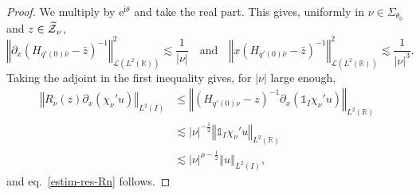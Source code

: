 \documentclass[10pt]{amsart}
\theoremstyle{definition}\newtheorem{defi}[theo]{Definition}\newtheorem{rema}[theo]{Remark}\newtheorem{exam}[theo]{Example}\newtheorem{exem}[theo]{Example}\newtheorem{nota}[theo]{Notation}
\newcommand{\abs}[1]{\left\vert #1\right\vert}
\newcommand{\nr}[1]{\left\Vert #1\right\Vert}
\renewcommand{\leq}{\leqslant}
\newcommand{\inv}{^{-1}}
\newcommand{\1}{\mathds 1}
\newcommand{\R}{\mathbb{R}}
\newcommand{\Lc}{{\mathcal L}}
\newcommand{\Zc}{\mathcal Z}
\newcommand{\eu}{\mathrm e}
\newcommand{\iu}{\mathrm i}
\renewcommand{\th}{\theta}
\let\oldtilde\tilde
\renewcommand*{\tilde}[1]{\mathchoice{\widetilde{#1}}{\widetilde{#1}}{\oldtilde{#1}}{\oldtilde{#1}}}
\begin{document}
\begin{proof}
We multiply by $\eu^{\iu\th}$ and take the real part. This gives, uniformly in $\nu \in \Sigma_{\th_0}$ and $z \in \tilde \Zc_\nu$,
\begin{equation}\label{eq:estim-partial-y-Hinv}
\nr{\partial_x \left(H_{q'(0)\bar \nu} - \bar z\right)\inv }_{\Lc\left(L^2(\R)\right)}^2 \lesssim \frac {1}{\abs \nu} \quad \text{and} \quad \nr{x \left(H_{q'(0)\bar \nu} - \bar z\right)\inv}_{\Lc\left(L^2(\R)\right)}^2 \lesssim \frac 1 {\abs \nu^3}.
\end{equation}
Taking the adjoint in the first inequality gives, for $\abs \nu$ large enough,
\begin{align*}
\nr{R_\nu(z) \partial_x \left(\chi_\nu' u\right)}_{L^2(I)} &\leq \nr{\left(H_{q'(0)\nu} - z\right)\inv \partial_x \left(\1_I \chi_\nu' u\right)}_{L^2(\R)}\\
&\lesssim \abs \nu^{-\frac 12} \nr{\1_I \chi_\nu'u}_{L^2(\R)}\\
&\lesssim \abs\nu^{\rho-\frac 12} \nr{u}_{L^2(I)},
\end{align*}
and eq.~\eqref{estim-res-Rn} follows.



\end{proof}
\end{document}
